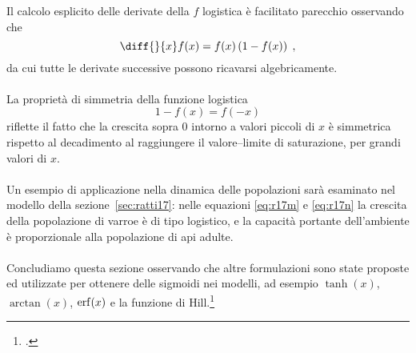 Il calcolo esplicito delle derivate della $f$ logistica è facilitato parecchio osservando che
$$\diff{}{x} f(x) = f(x) \left( {1-f(x)} \right) \; ,$$
da cui tutte le derivate successive possono ricavarsi algebricamente.

\paragraph{}
La proprietà di simmetria della funzione logistica
$$1 -f(x) = f(-x)$$
riflette il fatto che la crescita sopra $0$ intorno a valori piccoli di $x$ è
simmetrica rispetto al decadimento al raggiungere il valore--limite di saturazione,
per grandi valori di $x$.

\paragraph{}
Un esempio di applicazione nella dinamica delle popolazioni sarà esaminato nel modello della sezione~\ref{sec:ratti17}:
nelle equazioni \eqref{eq:r17m} e \eqref{eq:r17n} la crescita della popolazione di varroe è di tipo logistico,
e la capacità portante dell'ambiente è proporzionale alla popolazione di api adulte.

\paragraph{}
Concludiamo questa sezione osservando che altre formulazioni sono state proposte ed utilizzate per ottenere
delle sigmoidi nei modelli, ad esempio $\tanh (x)$, $\arctan (x)$, $\operatorname{erf} (x)$ e la funzione di Hill.\footcite{hill}

